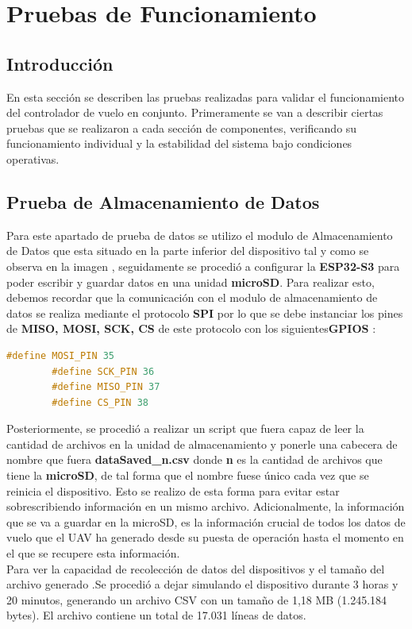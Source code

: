 \section{Pruebas de Funcionamiento}


    \subsection{Introducción}
        En esta sección se describen las pruebas realizadas para validar el funcionamiento del controlador de vuelo en conjunto. Primeramente se van a describir ciertas pruebas que se realizaron a cada sección de componentes, verificando su funcionamiento individual y la estabilidad del sistema bajo condiciones operativas.
    \subsection{Prueba de Almacenamiento de Datos}
        \vspace{5 px}
        Para este apartado de prueba de datos se utilizo el modulo de Almacenamiento de Datos que esta situado en la parte inferior del dispositivo tal y como se observa en la imagen , seguidamente se procedió a configurar la \textbf{ESP32-S3} para poder escribir y guardar datos en una unidad \textbf{microSD}. Para realizar esto, debemos recordar que la comunicación con el modulo de almacenamiento de datos se realiza mediante el protocolo \textbf{SPI} por lo que se debe instanciar los pines de \textbf{MISO, MOSI, SCK, CS} de este protocolo con los siguientes\textbf{GPIOS} :
        \vspace{5 px}
        \begin{lstlisting}[language=C++]
        #define MOSI_PIN 35
        #define SCK_PIN 36
        #define MISO_PIN 37
        #define CS_PIN 38
        \end{lstlisting}

        \vspace{5 px}

        Posteriormente, se procedió a realizar un script que fuera capaz de leer la cantidad de archivos en la unidad de almacenamiento y ponerle una cabecera de nombre que fuera \textbf{dataSaved\_n.csv} donde \textbf{n} es la cantidad de archivos que tiene la \textbf{microSD}, de tal forma que el nombre fuese único cada vez que se reinicia el dispositivo. Esto se realizo de esta forma para evitar estar sobrescribiendo información en un mismo archivo. Adicionalmente, la información que se va a guardar en la microSD, es la información crucial de todos los datos de vuelo que el UAV ha generado desde su puesta de operación hasta el momento en el que se recupere esta información. \\
        \vspace{10 px}
        Para ver la capacidad de recolección de datos del dispositivos y el tamaño del archivo generado .Se procedió a dejar simulando el dispositivo durante 3  horas y 20 minutos, generando un archivo CSV con un tamaño de 1,18 MB (1.245.184 bytes). El archivo contiene un total de 17.031 líneas de datos.



